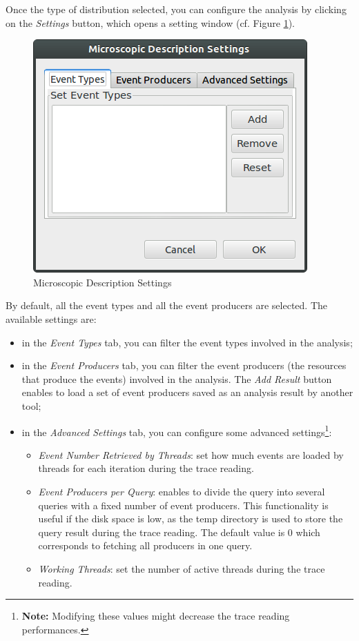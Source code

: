 \documentclass[twoside]{article}
\begin{document}
\begin{sloppypar}
Once the type of distribution selected, you can configure the analysis by clicking on the \textit{Settings} button, which opens a setting window (cf. Figure \ref{microSettings}). 
\begin{figure}[h!]
	\centering
	\includegraphics[scale=0.6]{images/state_settings.png}
	\caption{Microscopic Description Settings}
	\label{microSettings}
\end{figure}
By default, all the event types and all the event producers are selected. The available settings are:

\begin{itemize}
	\item in the \textit{Event Types} tab, you can filter the event types involved in the analysis;
	\item in the \textit{Event Producers} tab, you can filter the event producers (the resources that produce the events) involved in the analysis. The \textit{Add Result} button enables to load a set of event producers saved as an analysis result by another tool;
    \item in the \textit{Advanced Settings} tab, you can configure some advanced settings\footnote{\textbf{Note:} Modifying these values might decrease the trace reading performances.}:
	\begin{itemize}
		\item \textit{Event Number Retrieved by Threads}: set how much events are loaded by threads for each iteration during the trace reading.
        \item \textit{Event Producers per Query}: enables to divide the query into several queries with a fixed number of event producers. This functionality is useful if the disk space is low, as the temp directory is used to store the query result during the trace reading. The default value is 0 which corresponds to fetching all producers in one query.
        \item \textit{Working Threads}: set the number of active threads during the trace reading. 
	\end{itemize}
\end{itemize}


\end{sloppypar}
\end{document}
